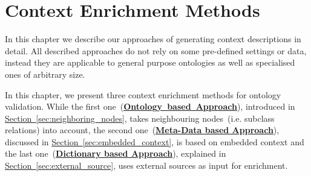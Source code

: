 \chapter{Context Enrichment Methods}\label{chap:context_enrichment_methods}
In this chapter we describe our approaches of generating context descriptions in detail. All described approaches do not rely on some pre-defined settings or data, instead they are applicable to general purpose ontologies as well as specialised ones of arbitrary size.

In this chapter, we present three context enrichment methods for ontology validation. While the first one~(\hyperref[sec:enrichment_ontology_approach]{\textbf{Ontology~based~Approach}}), introduced in \hyperref[sec:neighboring_nodes]{Section~\ref*{sec:neighboring_nodes}}, takes neighbouring nodes~(i.e. subclass relations) into account, the second one~(\hyperref[sec:enrichment_metaData_approach]{\textbf{Meta-Data based Approach}}), discussed in \hyperref[sec:embedded_context]{Section~\ref*{sec:embedded_context}}, is based on embedded context and the last one~(\hyperref[sec:enrichment_dictionary_approach]{\textbf{Dictionary based Approach}}), explained in \hyperref[sec:external_source]{Section~\ref*{sec:external_source}}, uses external sources as input for enrichment. 












